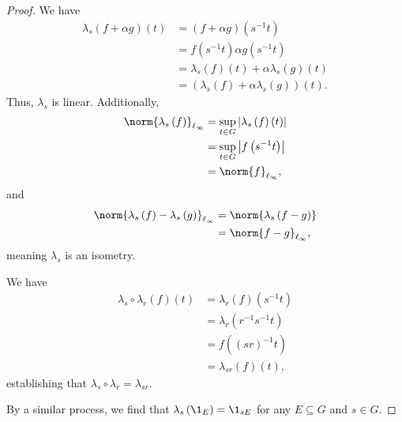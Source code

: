 \documentclass[10pt]{mypackage2}
\begin{document}
\begin{proof}
  We have
  \begin{align*}
    \lambda_s\left(f + \alpha g\right)\left(t\right) &= \left(f + \alpha g\right) \left(s^{-1}t\right)\\
                                                     &= f\left(s^{-1}t\right) \alpha g\left(s^{-1}t\right)\\
                                                     &= \lambda_s\left(f\right)\left(t\right) + \alpha \lambda_s\left(g\right)\left(t\right)\\
                                                     &= \left(\lambda_s\left(f\right) + \alpha \lambda_s\left(g\right)\right)(t).
  \end{align*}
  Thus, $\lambda_s$ is linear. Additionally,
  \begin{align*}
    \norm{\lambda_s\left(f\right)}_{\ell_{\infty}} &= \sup_{t\in G}\left\vert \lambda_s\left(f\right)\left(t\right) \right\vert\\
                                   &= \sup_{t\in G}\left\vert f\left(s^{-1}t\right) \right\vert\\
                                   &= \norm{f}_{\ell_{\infty}},
  \end{align*}
  and
  \begin{align*}
    \norm{\lambda_s\left(f\right) - \lambda_s\left(g\right)}_{\ell_{\infty}} &= \norm{\lambda_s\left(f-g\right)}\\
                                                                             &= \norm{f-g}_{\ell_{\infty}},
  \end{align*}
  meaning $\lambda_s$ is an isometry.\newline

  We have
  \begin{align*}
    \lambda_s\circ \lambda_r\left(f\right)\left(t\right) &= \lambda_r\left(f\right)\left(s^{-1}t\right)\\
                                                         &= \lambda_r\left(r^{-1}s^{-1}t\right)\\
                                                         &= f\left(\left(sr\right)^{-1}t\right)\\
                                                         &= \lambda_{sr}\left(f\right)\left(t\right),
  \end{align*}
  establishing that $\lambda_s\circ \lambda_r = \lambda_{sr}$.\newline

  By a similar process, we find that $\lambda_{s}\left(\1_{E}\right) = \1_{sE}$ for any $E\subseteq G$ and $s\in G$.
\end{proof}
\end{document}
